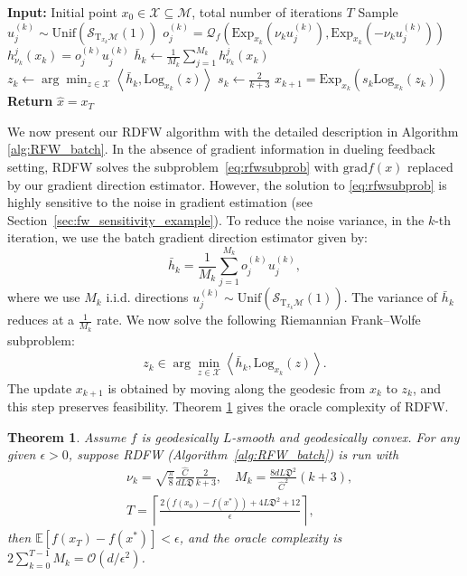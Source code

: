 \documentclass{article}
\newcommand{\rgrad}{\mathrm{grad}}
\newcommand{\Log}{\mathrm{Log}}
\newcommand{\pert}{\nu}
\theoremstyle{plain}
\newtheorem{theorem}{Theorem}[section]
\theoremstyle{definition}
\theoremstyle{remark}
\begin{document}
\begin{algorithm}[t]
\caption{Riemannian Dueling Frank-Wolfe Method (\textbf{RDFW})}
\label{alg:RFW_batch}
\begin{algorithmic}[1]
\STATE \textbf{Input:} Initial point $x_0 \in \mathcal{X} \subseteq \mathcal{M}$, total number of iterations $T$
        \STATE Sample $u^{(k)}_j \sim \mathrm{Unif}(\mathcal{S}_{\mathrm{T}_{x_k}\mathcal{M}}(1))$
        \STATE $o^{(k)}_j=\mathcal{Q}_f(\mathrm{Exp}_{x_k}(\pert_k u^{(k)}_j),\mathrm{Exp}_{x_k}(-\pert_k u^{(k)}_j))$
        \STATE $h_{\pert_k}^j(x_k) = o_j^{(k)} u^{(k)}_j$
    \ENDFOR
    \STATE $\bar h_k \gets \frac{1}{M_k}\sum_{j=1}^{M_k} h_{\pert_k}^j(x_k)$
    \STATE $z_k \gets \arg\min_{z\in\mathcal{X}} \left\langle \bar h_k, \Log_{x_k}(z)\right\rangle$
    \STATE $s_k \gets \frac{2}{k+3}$
    \STATE $x_{k+1}=\mathrm{Exp}_{x_k}(s_k\Log_{x_k}(z_k))$
\ENDFOR
\STATE \textbf{Return} $\hat{x} = x_{T}$
\end{algorithmic}
\end{algorithm}

We now present our RDFW algorithm with the detailed description in Algorithm \ref{alg:RFW_batch}. In the absence of gradient information in dueling feedback setting, RDFW solves the subproblem~\eqref{eq:rfwsubprob} with $\rgrad f(x)$ replaced by our gradient direction estimator. However, the solution to \eqref{eq:rfwsubprob} is highly sensitive to the noise in gradient estimation (see Section~\ref{sec:fw_sensitivity_example}). To reduce the noise variance, in the $k$-th iteration, we use the batch gradient direction estimator given by:
\begin{equation}\label{eq:batchgrad}
\bar{h}_k = \frac{1}{M_k}\sum_{j=1}^{M_k} o^{(k)}_ju^{(k)}_j,
\end{equation}
where we use $M_k$ i.i.d. directions $u^{(k)}_j \sim \mathrm{Unif}(\mathcal{S}_{\mathrm{T}_{x_k}\mathcal{M}}(1))$. The variance of $\bar{h}_k$ reduces at a $\frac{1}{M_k}$ rate. We now solve the following Riemannian Frank–Wolfe subproblem:
\begin{align*}
z_k \in \arg\min_{z\in\mathcal{X}} \left\langle \bar{h}_k, \Log_{x_k}(z)\right\rangle.
\end{align*}
The update $x_{k+1}$ is obtained by moving along the geodesic from $x_k$ to $z_k$, and this step preserves feasibility. Theorem \ref{thm:RFW_batch} gives the oracle complexity of RDFW.  
\begin{theorem}\label{thm:RFW_batch}
Assume $f$ is geodesically $L$-smooth and geodesically convex. For any given $\epsilon>0$, suppose RDFW (Algorithm~\ref{alg:RFW_batch}) is run with 
\begin{align*}
    &\pert_k=\sqrt{\frac{\pi}{8}}\frac{\hat{C}}{dL\mathfrak{D}}\frac{2}{k+3}, \quad M_k=\frac{8dL\mathfrak{D}^2}{\hat{C}^2}(k+3),\\
    &T=\left\lceil \frac{2(f(x_{0})-f(x^*)) + 4L\mathfrak{D}^2+12}{\epsilon}\right\rceil,
\end{align*} 
then $\mathbb{E}\left[f(x_{T}) - f(x^*)\right]<\epsilon$, and the oracle complexity is $2\sum_{k=0}^{T-1} M_k =\mathcal{O}(d/\epsilon^{2})$.
\end{theorem}
\end{document}
